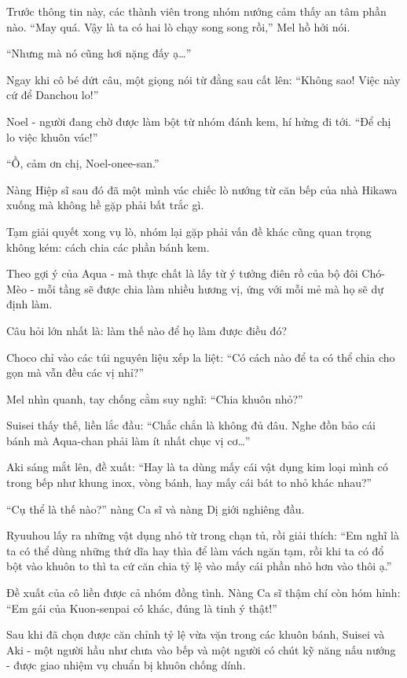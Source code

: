 \documentclass[../main.tex]{subfiles}
\begin{document}
Trước thông tin này, các thành viên trong nhóm nướng cảm thấy an tâm phần nào. ``May quá. Vậy là ta có hai lò chạy song song rồi,'' Mel hồ hởi nói.

``Nhưng mà nó cũng hơi nặng đấy ạ\dots''

Ngay khi cô bé dứt câu, một giọng nói từ đằng sau cất lên: ``Không sao! Việc này cứ để Danchou lo!''

Noel - người đang chờ được làm bột từ nhóm đánh kem, hí hửng đi tới. ``Để chị lo việc khuôn vác!''

``Ồ, cảm ơn chị, Noel-onee-san.''

Nàng Hiệp sĩ sau đó đã một mình vác chiếc lò nướng từ căn bếp của nhà Hikawa xuống mà không hề gặp phải bất trắc gì.

\ct

Tạm giải quyết xong vụ lò, nhóm lại gặp phải vấn đề khác cũng quan trọng không kém: cách chia các phần bánh kem.

Theo gợi ý của Aqua - mà thực chất là lấy từ ý tưởng điên rồ của bộ đôi Chó-Mèo - mỗi tầng sẽ được chia làm nhiều hương vị, ứng với mỗi mẻ mà họ sẽ dự định làm.

Câu hỏi lớn nhất là: làm thế nào để họ làm được điều đó?

Choco chỉ vào các túi nguyên liệu xếp la liệt: ``Có cách nào để ta có thể chia cho gọn mà vẫn đều các vị nhỉ?''

Mel nhìn quanh, tay chống cằm suy nghĩ: ``Chia khuôn nhỏ?''

Suisei thấy thế, liền lắc đầu: ``Chắc chắn là không đủ đâu. Nghe đồn bảo cái bánh mà Aqua-chan phải làm ít nhất chục vị cơ\dots''

Aki sáng mắt lên, đề xuất: ``Hay là ta dùng mấy cái vật dụng kim loại mình có trong bếp như khung inox, vòng bánh, hay mấy cái bát to nhỏ khác nhau?''

``Cụ thể là thế nào?'' nàng Ca sĩ và nàng Dị giới nghiêng đầu.

Ryuuhou lấy ra những vật dụng nhỏ từ trong chạn tủ, rồi giải thích: ``Em nghĩ là ta có thể dùng những thứ dĩa hay thìa để làm vách ngăn tạm, rồi khi ta có đổ bột vào khuôn to thì ta cứ căn chia tỷ lệ vào mấy cái phần nhỏ hơn vào thôi ạ.''

Đề xuất của cô liền được cả nhóm đồng tình. Nàng Ca sĩ thậm chí còn hóm hỉnh: ``Em gái của Kuon-senpai có khác, đúng là tinh ý thật!''

\ct

Sau khi đã chọn được căn chỉnh tỷ lệ vừa vặn trong các khuôn bánh, Suisei và Aki - một người hầu như chưa vào bếp và một người có chút kỹ năng nấu nướng - được giao nhiệm vụ chuẩn bị khuôn chống dính.
\end{document}
